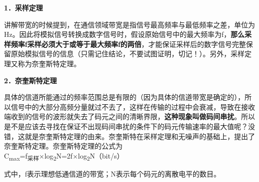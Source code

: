 \textbf{{1．采样定理}}

讲解带宽的时候提到，在通信领域带宽是指信号最高频率与最低频率之差，单位为Hz。因此将模拟信号转换成数字信号时，假设原始信号中的最大频率为f，{\textbf{那么采样频率f采样必须大于或等于最大频率f的两倍}}，才能保证采样后的数字信号完整保留原始模拟信号的信息（只需记住结论，不要试图证明，切记！）。另外，采样定理又称为奈奎斯特定理。

\textbf{{2．奈奎斯特定理}}

具体的信道所能通过的频率范围总是有限的（因为具体的信道带宽是确定的），所以信号中的大部分高频分量就过不去了，这样在传输的过程中会衰减，导致在接收端收到的信号的波形就失去了码元之间的清晰界限，\textbf{这种现象叫做码间串扰}。所以是不是应该去寻找在保证不出现码间串扰的条件下的码元传输速率的最大值呢？没错，这就是奈奎斯特定理的由来。奈奎斯特在采样定理和无噪声的基础上，提出了奈奎斯特定理。奈奎斯特定理的公式为\\

{C\textsubscript{max}=f}\textsubscript{采样}{×log\textsubscript{2}N=2f×log\textsubscript{2}N}（{bit/s}）{}

式中，f表示理想低通信道的带宽；N表示每个码元的离散电平的数目。
